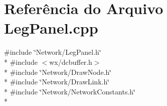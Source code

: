\section{Referência do Arquivo Leg\+Panel.\+cpp}
\label{_leg_panel_8cpp}
{\ttfamily \#include \char`\"{}Network/\+Leg\+Panel.\+h\char`\"{}}\\*
{\ttfamily \#include $<$wx/dcbuffer.\+h$>$}\\*
{\ttfamily \#include \char`\"{}Network/\+Draw\+Node.\+h\char`\"{}}\\*
{\ttfamily \#include \char`\"{}Network/\+Draw\+Link.\+h\char`\"{}}\\*
{\ttfamily \#include \char`\"{}Network/\+Network\+Constants.\+h\char`\"{}}\\*
